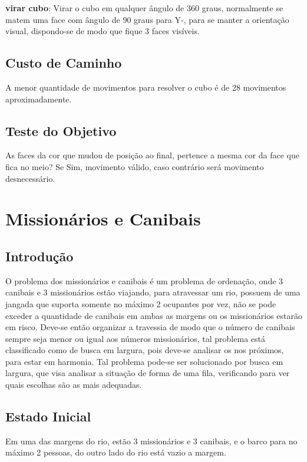\documentclass[12pt,a4paper,twocolumn]{article}
\begin{document}
 \textbf{virar cubo}:  Virar o cubo em qualquer ângulo de 360 graus, normalmente se matem uma face com ângulo de 90 graus para Y-, para se manter a orientação visual, dispondo-se de modo que fique 3 faces visíveis.
\subsection{Custo de Caminho}
A menor quantidade de movimentos para resolver o cubo é de 28 movimentos aproximadamente.

\subsection{Teste do Objetivo}
As faces da cor que mudou de posição ao final, pertence a mesma cor da face que fica no meio?
Se Sim, movimento válido, caso contrário será movimento desnecessário.



\section{Missionários e Canibais}
\subsection{Introdução}
O problema dos missionários e canibais é um problema de ordenação, onde 3 canibais e 3 missionários estão viajando, para atravessar um rio, possuem de uma jangada que suporta somente no máximo 2 ocupantes por vez, não se pode exceder a quantidade de canibais em ambas as margens ou os missionários estarão em risco. Deve-se então organizar a travessia de modo que o número de canibais sempre seja menor ou igual aos números missionários, tal problema está classificado como de busca em largura, pois deve-se analisar os nos próximos, para estar em harmonia. Tal problema pode-se ser solucionado por busca em largura, que visa analisar a situação de forma de uma fila, verificando para ver quais escolhas são as mais adequadas. 


\subsection{Estado Inicial}
   Em uma das margens do rio, estão 3 missionários e 3 canibais, e o barco para no máximo 2 pessoas, do outro lado do rio está vazio a margem.
\end{document}

